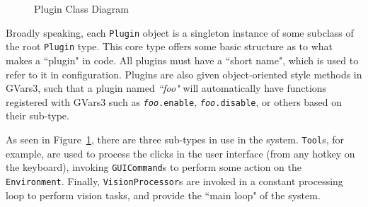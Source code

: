 \documentclass[a4paper,10pt]{article}
\begin{document}
\begin{figure}[h]
\begin{center}
        \normalsize
  \end{center}
  \caption{Plugin Class Diagram}
  \label{pluginclasses}
\end{figure}

Broadly speaking, each \texttt{Plugin} object is a singleton instance of some subclass of the root \texttt{Plugin} type. This core type offers some basic structure as to what makes a ``plugin" in code. All plugins must have a ``short name", which is used to refer to it in configuration. Plugins are also given object-oriented style methods in GVars3, such that a plugin named \textit{``foo"} will automatically have functions registered with GVars3 such as  \texttt{\textit{foo}.enable},  \texttt{\textit{foo}.disable}, or others based on their sub-type. 

As seen in Figure~\ref{pluginclasses}, there are three sub-types in use in the system. \texttt{Tool}s, for example, are used to process the clicks in the user interface (from any hotkey on the keyboard), invoking \texttt{GUICommand}s to perform some action on the \texttt{Environment}. Finally, \texttt{VisionProcessor}s are invoked in a constant processing loop to perform vision tasks, and provide the ``main loop" of the system.
\end{document}
